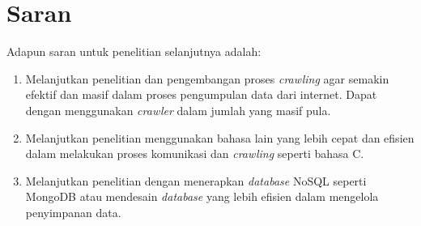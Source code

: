 \section{Saran}
Adapun saran untuk penelitian selanjutnya adalah:
\begin{enumerate} 
	\item Melanjutkan penelitian dan pengembangan proses \emph{crawling} agar semakin efektif dan masif dalam proses pengumpulan data dari internet. Dapat dengan menggunakan \emph{crawler} dalam jumlah yang masif pula.
	\item Melanjutkan penelitian menggunakan bahasa lain yang lebih cepat dan efisien dalam melakukan proses komunikasi dan \emph{crawling} seperti bahasa C.
	\item Melanjutkan penelitian dengan menerapkan \emph{database} NoSQL seperti MongoDB atau mendesain \emph{database} yang lebih efisien dalam mengelola penyimpanan data.
\end{enumerate}


\begin{comment}

\end{comment}
